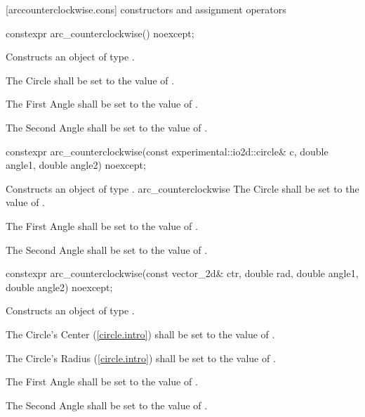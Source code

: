  [arccounterclockwise.cons] { constructors and assignment operators}

\begin{itemdecl}
constexpr arc_counterclockwise() noexcept;
\end{itemdecl}
\begin{itemdescr}
\pnum
\effects
Constructs an object of type .

\pnum
The Circle shall be set to the value of .

\pnum
The First Angle shall be set to the value of .

\pnum
The Second Angle shall be set to the value of .
\end{itemdescr}

\begin{itemdecl}
constexpr arc_counterclockwise(const experimental::io2d::circle& c,
  double angle1, double angle2) noexcept;
\end{itemdecl}
\begin{itemdescr}
\pnum
\effects
Constructs an object of type .
arc_counterclockwise
\pnum
The Circle shall be set to the value of .

\pnum
The First Angle shall be set to the value of .

\pnum
The Second Angle shall be set to the value of .
\end{itemdescr}

\begin{itemdecl}
constexpr arc_counterclockwise(const vector_2d& ctr, double rad, double angle1,
  double angle2) noexcept;
\end{itemdecl}
\begin{itemdescr}
\pnum
\effects
Constructs an object of type .

\pnum
The Circle's Center (\ref{circle.intro}) shall be set to the value of .

\pnum
The Circle's Radius (\ref{circle.intro}) shall be set to the value of .

\pnum
The First Angle shall be set to the value of .

\pnum
The Second Angle shall be set to the value of .
\end{itemdescr}

